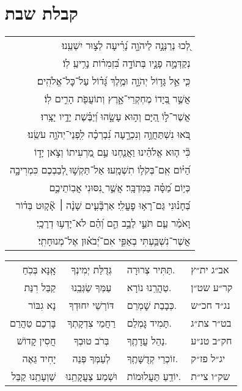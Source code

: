 \documentclass[12pt,letterpaper]{siddur}
\begin{document}
\chapter{קבלת שבת}
\begin{longtable}[r]{r}
לְ֭כוּ נְרַנְּנָ֣ה לַיהֹוָ֑ה \hfill
נָ֝רִ֗יעָה לְצ֣וּר יִשְׁעֵֽנוּ׃\\
נְקַדְּמָ֣ה פָנָ֣יו בְּתוֹדָ֑ה \hfill
בִּ֝זְמִר֗וֹת נָרִ֥יעַֽ לֽוֹ׃\\
כִּ֤י אֵ֣ל גָּד֣וֹל יְהֹוָ֑ה \hfill
וּמֶ֥לֶךְ גָּ֝ד֗וֹל עַל־כׇּל־אֱלֹהִֽים׃\\
אֲשֶׁ֣ר בְּ֭יָדוֹ מֶחְקְרֵי־אָ֑רֶץ \hfill
וְתוֹעֲפֹ֖ת הָרִ֣ים לֽוֹ׃\\
אֲשֶׁר־ל֣וֹ הַ֭יָּם וְה֣וּא עָשָׂ֑הוּ \hfill
וְ֝יַבֶּ֗שֶׁת יָדָ֥יו יָצָֽרוּ׃\\
בֹּ֭אוּ נִשְׁתַּחֲוֶ֣ה וְנִכְרָ֑עָה \hfill
נִ֝בְרְכָ֗ה לִֽפְנֵי־יְהֹוָ֥ה עֹשֵֽׂנוּ׃\\
כִּ֘י ה֤וּא אֱלֹהֵ֗ינוּ \hfill
וַאֲנַ֤חְנוּ עַ֣ם מַ֭רְעִיתוֹ וְצֹ֣אן יָד֑וֹ\\
הַ֝יּ֗וֹם אִֽם־בְּקֹל֥וֹ תִשְׁמָֽעוּ׃ \hfill
אַל־תַּקְשׁ֣וּ לְ֭בַבְכֶם כִּמְרִיבָ֑ה\\
כְּי֥וֹם מַ֝סָּ֗ה בַּמִּדְבָּֽר׃ \hfill
אֲשֶׁ֣ר נִ֭סּוּנִי אֲבֽוֹתֵיכֶ֑ם\\
בְּ֝חָנ֗וּנִי גַּם־רָא֥וּ פׇעֳלִֽי׃ \hfill
אַרְבָּ֘עִ֤ים שָׁנָ֨ה ׀ אָ֘ק֤וּט בְּד֗וֹר\\
וָאֹמַ֗ר עַ֤ם תֹּעֵ֣י לֵבָ֣ב הֵ֑ם \hfill
וְ֝הֵ֗ם לֹא־יָדְע֥וּ דְרָכָֽי׃\\
אֲשֶׁר־נִשְׁבַּ֥עְתִּי בְאַפִּ֑י\hfill
אִם־יְ֝בֹא֗וּן אֶל־מְנוּחָתִֽי׃
\end{longtable}
\begin{tabular}{r c l l}
אָֽנָּא בְּכֹֽחַ & גְּדֻלַּת יְמִינְךָ & תַּתִּיר צְרוּרָה. & אב״ג ית״ץ\\
קַבֵּל רִנַּת & עַמְּךָ שַׂגְּבֵֽנוּ & טַהֲרֵֽנוּ נוֹרָא. & קר״ע שט״ן\\
נָא גִבּוֹר & דּוֹרְשֵׁי יִחוּדְךָ & כְּבָבַת שׇׁמְרֵם. & נג״ד חכ״ש\\
בָּרְכֵם טַהֲרֵם & רַחֲמֵי צִדְקָתְךָ & תָּמִיד גׇּמְלֵם. & בט״ר צת״ג\\
חֲסִין קָדוֹשׁ & בְּרֹב טוּבְךָ & נַהֵל עֲדָתֶֽךָ. & חק״ב טנ״ע\\
יָחִיד גֵּאֶה & לְעַמְּךָ פְּנֵה & זוֹכְרֵי קְדֻשָּׁתֶֽךָ. & יג״ל פז״ק\\
שַׁוְעָתֵֽנוּ קַבֵּל & וּשְׁמַע צַעֲקָתֵֽנוּ & יוֹדֵֽעַ תַּעֲלוּמוֹת. & שק״ו צי״ת
\end{tabular}
\end{document}

